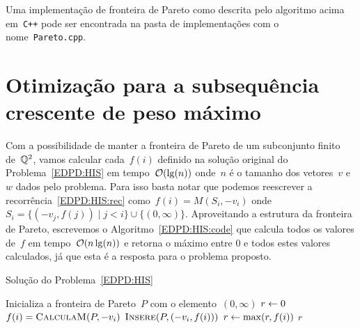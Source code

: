 Uma implementação de fronteira de Pareto como descrita pelo algoritmo acima em~\texttt{C++} pode ser encontrada na pasta de implementações com o nome~\texttt{Pareto.cpp}.



\section{Otimização para a subsequência crescente de peso máximo}

Com a possibilidade de manter a fronteira de Pareto de um subconjunto finito de~$\mathbb{Q}^2$, vamos calcular cada~$f(i)$ definido na solução original do Problema~\ref{EDPD:HIS} em tempo~$\mathcal{O}(\lg(n))$ onde~$n$ é o tamanho dos vetores~$v$ e~$w$ dados pelo problema. Para isso basta notar que podemos reescrever a recorrência~\eqref{EDPD:HIS:rec} como~$f(i) = M(S_i,-v_i)$ onde~$S_i = \{(-v_j,f(j)) \mid j < i\} \cup \{(0,\infty)\}$. Aproveitando a estrutura da fronteira de Pareto, escrevemos o Algoritmo~\ref{EDPD:HIS:code} que calcula todos os valores de~$f$ em tempo~$\mathcal{O}(n\lg(n))$ e retorna o máximo entre 0 e todos estes valores calculados, já que esta é a resposta para o problema proposto.

\begin{algorithm}[h]
\caption{Solução do Problema~\ref{EDPD:HIS}}
\label{EDPD:HIS:code}
\begin{algorithmic}[1]
    \State Inicializa a fronteira de Pareto~$P$ com o elemento~$(0,\infty)$
    \State $r \leftarrow 0$
        \State $f(i) = \textsc{CalculaM}(P,-v_i)$
        \State $\textsc{Insere}(P,(-v_i,f(i)))$
        \State $r \leftarrow \max(r,f(i))$
    \EndFor
    \State \Return $r$
\EndFunction
\end{algorithmic}
\end{algorithm}
